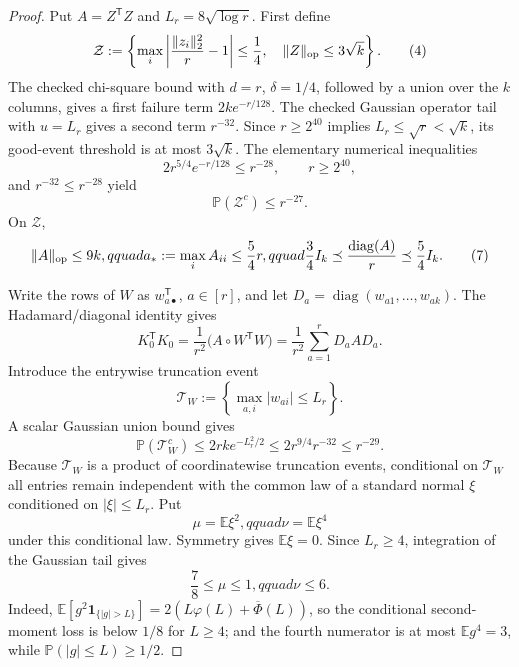 \begin{proof}
Put \(A=Z^{\mathsf T}Z\) and
\(L_r=8\sqrt{\log r}\). First define
\[
  \mathcal Z
  :=\left\{
    \max_i\left|\frac{\|z_i\|_2^2}{r}-1\right|\le\frac14,
    \quad \|Z\|_{\rm op}\le3\sqrt k
  \right\}.                                                \tag{4}
\]
The checked chi-square bound with \(d=r\), \(\delta=1/4\), followed by a
union over the \(k\) columns, gives a first failure term
\(2ke^{-r/128}\). The checked Gaussian operator tail with \(u=L_r\) gives
a second term \(r^{-32}\). Since \(r\ge2^{40}\) implies
\(L_r\le\sqrt r<\sqrt k\), its good-event threshold is at most
\(3\sqrt k\). The elementary numerical inequalities
\[
  2r^{5/4}e^{-r/128}\le r^{-28},
  \qquad r\ge2^{40},                                       \tag{5}
\]
and \(r^{-32}\le r^{-28}\) yield
\[
  \mathbb P(\mathcal Z^c)\le r^{-27}.                     \tag{6}
\]
On \(\mathcal Z\),
\[
  \|A\|_{\rm op}\le9k,qquad
  a_*:=\max_i A_{ii}\le\frac54r,qquad
  \frac34I_k\preceq\frac{\operatorname{diag}(A)}r
    \preceq\frac54I_k.                                    \tag{7}
\]

Write the rows of \(W\) as \(w_{a\bullet}^{\mathsf T}\),
\(a\in[r]\), and let
\(D_a=\operatorname{diag}(w_{a1},\ldots,w_{ak})\). The Hadamard/diagonal
identity gives
\[
  K_0^{\mathsf T}K_0
  =\frac1{r^2}\bigl(A\circ W^{\mathsf T}W\bigr)
  =\frac1{r^2}\sum_{a=1}^r D_aAD_a.                        \tag{8}
\]
Introduce the entrywise truncation event
\[
  \mathcal T_W:=\left\{\max_{a,i}|w_{ai}|\le L_r\right\}.
\]
A scalar Gaussian union bound gives
\[
  \mathbb P(\mathcal T_W^c)
  \le2rk e^{-L_r^2/2}
  \le2r^{9/4}r^{-32}
  \le r^{-29}.                                             \tag{9}
\]
Because \(\mathcal T_W\) is a product of coordinatewise truncation events,
conditional on \(\mathcal T_W\) all entries remain independent with the
common law of a standard normal \(\xi\) conditioned on
\(|\xi|\le L_r\). Put
\[
  \mu=\mathbb E\xi^2,qquad \nu=\mathbb E\xi^4
\]
under this conditional law. Symmetry gives \(\mathbb E\xi=0\). Since
\(L_r\ge4\), integration of the Gaussian tail gives
\[
  \frac78\le\mu\le1,qquad \nu\le6.                      \tag{10}
\]
Indeed,
\(\mathbb E[g^2\mathbf1_{\{|g|>L\}}]
 =2(L\varphi(L)+\overline\Phi(L))\), so the conditional second-moment loss
is below \(1/8\) for \(L\ge4\); and the fourth numerator is at most
\(\mathbb Eg^4=3\), while
\(\mathbb P(|g|\le L)\ge1/2\).


\end{proof}
